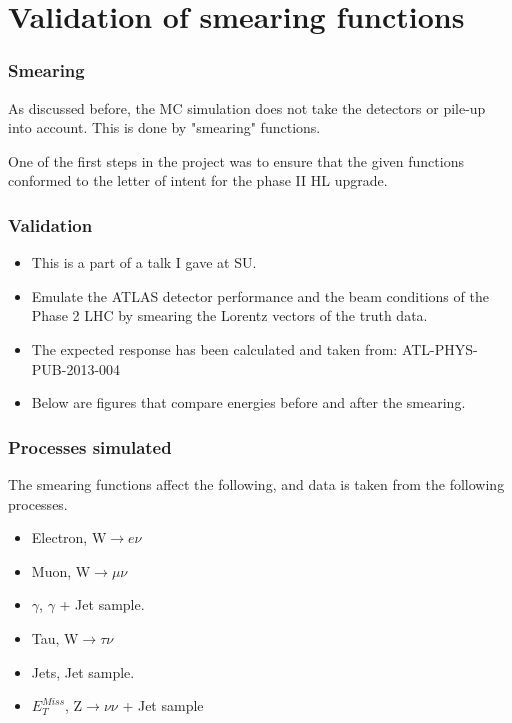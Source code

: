 \documentclass[•]{beamer}
\theoremstyle{remark}
\begin{document}
\section{Validation of smearing functions}
\begin{frame}\frametitle{Smearing}
\begin{block}

As discussed before, the MC simulation does not take the detectors or pile-up into account. This is done by "smearing" functions. 

One of the first steps in the project was to ensure that the given functions conformed to the letter of intent for the phase II HL upgrade.
\end{block}

\end{frame}
\begin{frame}\frametitle{Validation}
\begin{block}

\begin{itemize}
\item This is a part of a talk I gave at SU.
\item Emulate the ATLAS detector performance and the beam conditions of the Phase 2 LHC by smearing the Lorentz vectors of the truth data.
\item The expected response has been calculated and taken from: ATL-PHYS-PUB-2013-004
\item Below are figures that compare energies before and after the smearing. 
\end{itemize}
\end{block}
\end{frame}
\begin{frame}\frametitle{Processes simulated}
\begin{example}
The smearing functions affect the following, and data is taken from the following processes.
\begin{itemize}
\item Electron, W$\rightarrow e\nu$
\item Muon, W$\rightarrow \mu \nu$
\item $\gamma$, $\gamma$ + Jet sample.
\item Tau, W$\rightarrow \tau \nu$
\item Jets, Jet sample.
\item $E_T^{Miss}$, Z$\rightarrow \nu \nu$ + Jet sample
\end{itemize}
\end{example}
\end{frame}
\end{document}
